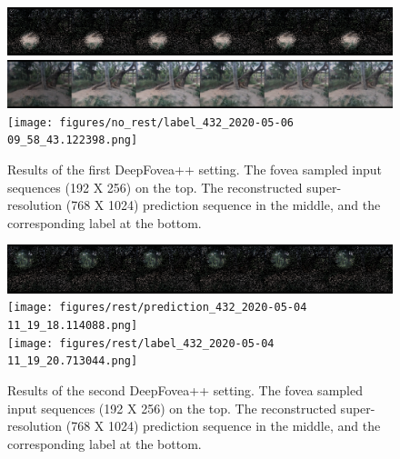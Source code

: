 \documentclass[10pt,twocolumn,letterpaper]{article}
\begin{document}
\begin{figure}[h!]
    \centering
    \includegraphics[width=\columnwidth]{figures/no_rest/input_432_2020-05-06 09_58_44.696719.png}\\\vspace{-0.1cm}
    \includegraphics[width=\columnwidth]{figures/no_rest/prediction_432_2020-05-06 09_58_40.811600.png}\\\vspace{-0.1cm}
    \texttt{[image: figures/no\_rest/label\_432\_2020-05-06 09\_58\_43.122398.png]}\\
    \caption{Results of the first DeepFovea++ setting. The fovea sampled input sequences (192 X 256) on the top. The reconstructed super-resolution (768 X 1024) prediction sequence in the middle, and the corresponding label at the bottom.}
    \label{fig:norestresults2}
\end{figure}

\begin{figure}[h!]
    \centering
    \includegraphics[width=\columnwidth]{figures/rest/input_432_2020-05-04 11_19_22.304534.png}\\\vspace{-0.1cm}
    \texttt{[image: figures/rest/prediction\_432\_2020-05-04 11\_19\_18.114088.png]}\\\vspace{-0.1cm}
    \texttt{[image: figures/rest/label\_432\_2020-05-04 11\_19\_20.713044.png]}\\
    \caption{Results of the second DeepFovea++ setting. The fovea sampled input sequences (192 X 256) on the top. The reconstructed super-resolution (768 X 1024) prediction sequence in the middle, and the corresponding label at the bottom.}
    \label{fig:restresults2}
\end{figure}
\end{document}
